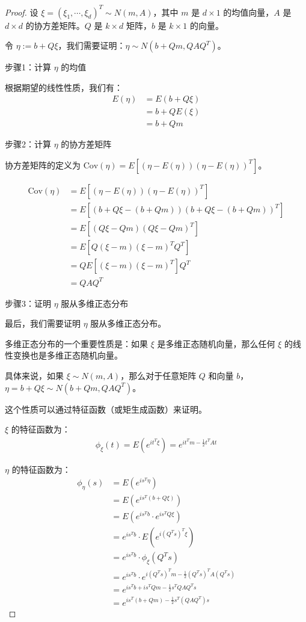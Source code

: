 \documentclass[lang=cn,10pt,thmcnt=section]{elegantbook}
\begin{document}
\begin{proof}
		设 $\xi = (\xi_1, \cdots, \xi_d)^T \sim N(m, A)$，其中 $m$ 是 $d \times 1$ 的均值向量，$A$ 是 $d \times d$ 的协方差矩阵。$Q$ 是 $k \times d$ 矩阵，$b$ 是 $k \times 1$ 的向量。
		
		令 $\eta := b + Q\xi$，我们需要证明：$\eta \sim N(b + Qm, QAQ^T)$。
		
		步骤1：计算 $\eta$ 的均值
		
		根据期望的线性性质，我们有：
		\begin{align}
		E(\eta) &= E(b + Q\xi) \\
		&= b + QE(\xi) \\
		&= b + Qm
		\end{align}
		
		步骤2：计算 $\eta$ 的协方差矩阵
		
		协方差矩阵的定义为 $\text{Cov}(\eta) = E[(\eta - E(\eta))(\eta - E(\eta))^T]$。
		
		\begin{align}
		\text{Cov}(\eta) &= E[(\eta - E(\eta))(\eta - E(\eta))^T] \\
		&= E[(b + Q\xi - (b + Qm))(b + Q\xi - (b + Qm))^T] \\
		&= E[(Q\xi - Qm)(Q\xi - Qm)^T] \\
		&= E[Q(\xi - m)(\xi - m)^T Q^T] \\
		&= QE[(\xi - m)(\xi - m)^T]Q^T \\
		&= QAQ^T
		\end{align}
		
		步骤3：证明 $\eta$ 服从多维正态分布
		
		最后，我们需要证明 $\eta$ 服从多维正态分布。
		
		多维正态分布的一个重要性质是：如果 $\xi$ 是多维正态随机向量，那么任何 $\xi$ 的线性变换也是多维正态随机向量。
		
		具体来说，如果 $\xi \sim N(m, A)$，那么对于任意矩阵 $Q$ 和向量 $b$，$\eta = b + Q\xi \sim N(b + Qm, QAQ^T)$。
		
		这个性质可以通过特征函数（或矩生成函数）来证明。
		
		$\xi$ 的特征函数为：
		\begin{align}
		\phi_{\xi}(t) = E(e^{it^T\xi}) = e^{it^Tm - \frac{1}{2}t^TAt}
		\end{align}
		
		$\eta$ 的特征函数为：
		\begin{align}
		\phi_{\eta}(s) &= E(e^{is^T\eta}) \\
		&= E(e^{is^T(b + Q\xi)}) \\
		&= E(e^{is^Tb} \cdot e^{is^TQ\xi}) \\
		&= e^{is^Tb} \cdot E(e^{i(Q^Ts)^T\xi}) \\
		&= e^{is^Tb} \cdot \phi_{\xi}(Q^Ts) \\
		&= e^{is^Tb} \cdot e^{i(Q^Ts)^Tm - \frac{1}{2}(Q^Ts)^TA(Q^Ts)} \\
		&= e^{is^Tb + is^TQm - \frac{1}{2}s^TQAQ^Ts} \\
		&= e^{is^T(b + Qm) - \frac{1}{2}s^T(QAQ^T)s}
		\end{align}
		

\end{proof}
\end{document}

